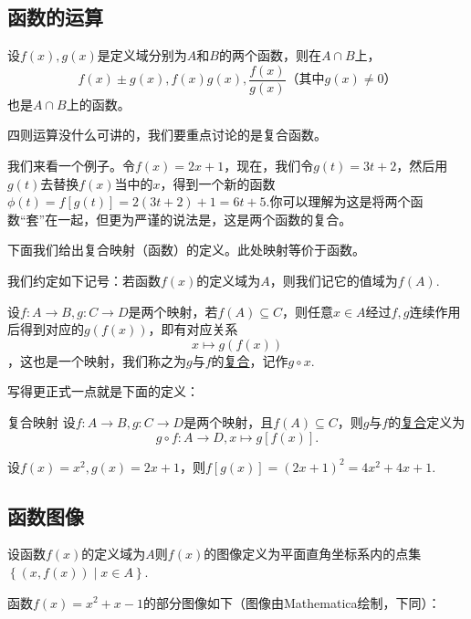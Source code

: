 \documentclass[lang=cn,math=cm,chinesefont=nofont,11pt,scheme=chinese,twocol]{elegantbook}
\begin{document}
\subsection{函数的运算}

设$f(x),g(x)$是定义域分别为$A$和$B$的两个函数，则在$A\cap B$上，$$f(x)\pm g(x),f(x)g(x),\dfrac{f(x)}{g(x)}\text{（其中}g(x)\neq 0\text{）}$$也是$A\cap B$上的函数。

四则运算没什么可讲的，我们要重点讨论的是复合函数。

我们来看一个例子。令$f(x)=2x+1$，现在，我们令$g(t)=3t+2$，然后用$g(t)$去替换$f(x)$当中的$x$，得到一个新的函数$\phi(t)=f[g(t)]=2(3t+2)+1=6t+5$.你可以理解为这是将两个函数“套”在一起，但更为严谨的说法是，这是两个函数的复合。

下面我们给出复合映射（函数）的定义。此处映射等价于函数。

\begin{remark}
  我们约定如下记号：若函数$f(x)$的定义域为$A$，则我们记它的值域为$f(A)$.
\end{remark}

设$f:A\rightarrow B,g:C\rightarrow D$是两个映射，若$f(A)\subseteq C$，则任意$x\in A$经过$f,g$连续作用后得到对应的$g(f(x))$，即有对应关系$$x\mapsto g(f(x))$$，这也是一个映射，我们称之为$g$与$f$的\underline{复合}，记作$g\circ x$.

写得更正式一点就是下面的定义：

\begin{definition}{复合映射}
  设$f:A\rightarrow B,g:C\rightarrow D$是两个映射，且$f(A)\subseteq C$，则$g$与$f$的\underline{复合}定义为$$g\circ f:A\rightarrow D,x\mapsto g[f(x)].$$
\end{definition}

\begin{example}
  设$f(x)=x^2,g(x)=2x+1$，则$f[g(x)]=(2x+1)^2=4x^2+4x+1$.
\end{example}

\subsection{函数图像}

\begin{definition}
  设函数$f(x)$的定义域为$A$则$f(x)$的图像定义为平面直角坐标系内的点集$\left\{(x,f(x))\mid x\in A\right\}$.
\end{definition}

\begin{example}
  函数$f(x)=x^2+x-1$的部分图像如下（图像由Mathematica绘制，下同）：
\end{example}
\end{document}
